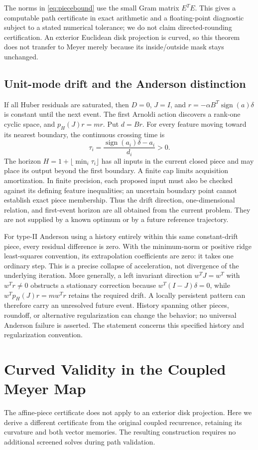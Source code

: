 \documentclass[journal]{IEEEtran}
\theoremstyle{definition}
\begin{document}
The norms in \eqref{eq:piecebound} use the small Gram matrix $E^TE$.
This gives a computable path certificate in exact arithmetic and a
floating-point diagnostic subject to a stated numerical tolerance;
we do not claim directed-rounding certification. An exterior Euclidean
disk projection is curved, so this theorem does not transfer to Meyer
merely because its inside/outside mask stays unchanged.

\subsection{Unit-mode drift and the Anderson distinction}
If all Huber residuals are saturated, then $D=0$, $J=I$, and
$r=-\alpha B^T\operatorname{sign}(a)\delta$ is constant until the next event.
The first Arnoldi action discovers a rank-one cyclic space, and
$p_H(J)r=mr$. Put $d=Br$. For every feature moving toward its nearest
boundary, the continuous crossing time is
\[
 \tau_i=\frac{\operatorname{sign}(a_i)\delta-a_i}{d_i}>0.
\]
The horizon $H=1+\lfloor\min_i\tau_i\rfloor$ has all inputs in the current
closed piece and may place its output beyond the first boundary. A finite
cap limits acquisition amortization. In finite precision, each proposed
input must also be checked against its defining feature inequalities;
an uncertain boundary point cannot establish exact piece membership.
Thus the drift direction, one-dimensional relation, and first-event horizon
are all obtained from the current problem. They are not supplied by a
known optimum or by a future reference trajectory.

For type-II Anderson using a history entirely within this same constant-drift
piece, every residual difference is zero. With the minimum-norm or positive
ridge least-squares convention, its extrapolation coefficients are zero:
it takes one ordinary step. This is a precise collapse of acceleration,
not divergence of the underlying iteration. More generally, a left invariant direction $w^TJ=w^T$ with $w^Tr\ne0$
obstructs a stationary correction because $w^T(I-J)\delta=0$, while
$w^Tp_H(J)r=mw^Tr$ retains the required drift. A locally persistent pattern can therefore carry an unresolved future
event. History spanning other pieces,
roundoff, or alternative regularization can change the behavior; no universal
Anderson failure is asserted. The statement concerns this specified history and regularization convention.

\section{Curved Validity in the Coupled Meyer Map}\label{sec:curved}
The affine-piece certificate does not apply to an exterior disk projection.
Here we derive a different certificate from the original coupled recurrence,
retaining its curvature and both vector memories. The resulting construction
requires no additional screened solves during path validation.
\end{document}
